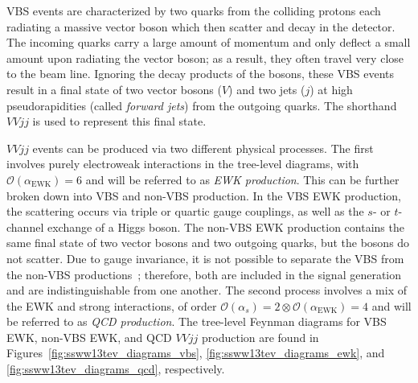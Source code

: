 VBS events are characterized by two quarks from the colliding protons each radiating a massive vector boson which then scatter and decay in the detector.
The incoming quarks carry a large amount of momentum and only deflect a small amount upon radiating the vector boson; as a result, they often travel very close to the beam line.
Ignoring the decay products of the bosons, these VBS events result in a final state of two vector bosons ($V$) and two jets ($j$) at high pseudorapidities (called \emph{forward jets}) from the outgoing quarks.
The shorthand $VVjj$ is used to represent this final state.

$VVjj$ events can be produced via two different physical processes.
The first involves purely electroweak interactions in the tree-level diagrams, with $\mathcal{O}(\alpha_{\textrm{EWK}}) = 6$ %
and will be referred to as \emph{EWK production}.
This can be further broken down into VBS and non-VBS production.
In the VBS EWK production, the scattering occurs via triple or quartic gauge couplings, as well as the $s$- or $t$-channel exchange of a Higgs boson.
The non-VBS EWK production contains the same final state of two vector bosons and two outgoing quarks, but the bosons do not scatter.
Due to gauge invariance, it is not possible to separate the VBS from the non-VBS productions~\cite{2006.isolating-vbs-lhc}; therefore, both are included in the signal generation and are indistinguishable from one another.
The second process involves a mix of the EWK and strong interactions, of order $\mathcal{O}(\alpha_s) = 2 \otimes \mathcal{O}(\alpha_{\textrm{EWK}}) = 4$ and will be referred to as \emph{QCD production}.
The tree-level Feynman diagrams for VBS EWK, non-VBS EWK, and QCD $VVjj$ production are found in Figures~\ref{fig:ssww13tev_diagrams_vbs}, \ref{fig:ssww13tev_diagrams_ewk}, and \ref{fig:ssww13tev_diagrams_qcd}, respectively.

